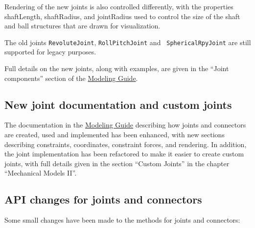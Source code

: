 \documentclass{article}
\begin{document}
Rendering of the new joints is also controlled differently, with
the properties {\sf shaftLength}, {\sf shaftRadius}, and {\sf jointRadius}
used to control the size of the shaft and ball structures that are
drawn for visualization.

The old joints {\tt RevoluteJoint}, {\tt RollPitchJoint} and {\tt
SphericalRpyJoint} are still supported for legacy purposes.

Full details on the new joints, along with examples, are given in the
``Joint components'' section of the
\href{http://www.artisynth.org/doc/pdf/modelguide.pdf}
{Modeling Guide}.

\subsection*{New joint documentation and custom joints}

The documentation in the
\href{http://www.artisynth.org/doc/pdf/modelguide.pdf} {Modeling
Guide} describing how joints and connectors are created, used and
implemented has been enhanced, with new sections describing
constraints, coordinates, constraint forces, and rendering.  In
addition, the joint implementation has been refactored to make it
easier to create custom joints, with full details given in the section
``Custom Joints'' in the chapter ``Mechanical Models II''.

\subsection*{API changes for joints and connectors}

Some small changes have been made to the methods for joints and
connectors:
\end{document}
